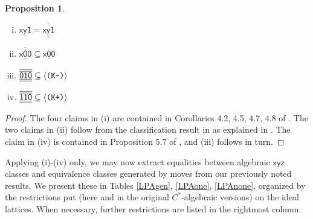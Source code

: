 \documentclass[12pt]{amsbook}%
\newtheorem{propo}[theor]{Proposition}
\theoremstyle{defin}
\theoremstyle{remark}
\numberwithin{equation}{chapter}
\numberwithin{theor}{section}
\newcommand{\xyz}[1]{\mbox{$\mathsf{#1}$}}
\newcommand{\xyzrel}[1]{\mbox{$\overline{\underline{\mathsf{ #1}}}$}}
\newcommand{\xyzLPArel}[1]{\mbox{$\overline{\overline{\underline{\underline{\mathsf{ #1}}}}}$}}
\newcommand{\KKKp}{\mbox{\texttt{\textup{(K+)}}}}
\newcommand{\KKKm}{\mbox{\texttt{\textup{(K-)}}}}
\begin{document}
\begin{propo}\mbox{}\\
\begin{enumerate}[(i)]
\item $\xyzrel{xy1}=\xyzLPArel{xy1}$
\item $ \xyzLPArel{x00}\subseteq \xyzrel{x00}$
\item $\xyzLPArel{010}\subseteq\langle\KKKm\rangle$
\item $\xyzLPArel{110}\subseteq\langle\KKKp\rangle$
\end{enumerate}
 \end{propo}
 \begin{proof}
 The four claims in (i) are contained in Corollaries 4.2, 4.5, 4.7, 4.8 of \cite{tmcjr:dpgisa}. The two claims in (ii) follow from the classification result in \cite{segrerapws:ccuggs} as explained in \cite{segrerapws:fkga}. The claim in (iv) is contained in Proposition 5.7 of \cite{parhhlas:gsar}, and (iii) follows in turn.
 \end{proof}
 
 
 Applying (i)-(iv) only, we may now extract equalities between algebraic \xyz{xyz} classes and equivalence classes generated by moves from our previously noted results. We present these in Tables \ref{LPAgen}, \ref{LPAone}, \ref{LPAnone}, organized by the restrictions put (here and in the original $C^*$-algebraic versions) on the ideal lattices. When necessary, further restrictions are listed in the rightmost column.
 
\end{document}
